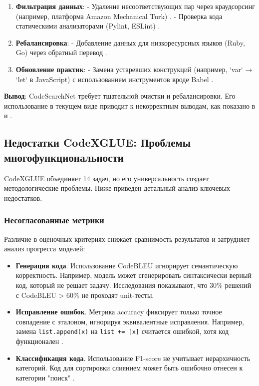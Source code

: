 \documentclass[14pt]{article}
\theoremstyle{definition}
\begin{document}
\begin{enumerate}
    \item \textbf{Фильтрация данных}: 
    - Удаление несоответствующих пар через краудсорсинг (например, платформа Amazon Mechanical Turk) \cite{zhang2020retrieval}.
    - Проверка кода статическими анализаторами (Pylint, ESLint) \cite{liu2022survey}.
    
    \item \textbf{Ребалансировка}: 
    - Добавление данных для низкоресурсных языков (Ruby, Go) через обратный перевод \cite{wan2023codet5+}.
    
    \item \textbf{Обновление практик}: 
    - Замена устаревших конструкций (например, `var` → `let` в JavaScript) с использованием инструментов вроде Babel \cite{zhu2022}.
\end{enumerate}

\textbf{Вывод}: CodeSearchNet требует тщательной очистки и ребалансировки. Его использование в текущем виде приводит к некорректным выводам, как показано в \cite{chen2023} и \cite{allamanis2019adverse}.



\newpage

\subsection{Недостатки CodeXGLUE: Проблемы многофункциональности}

CodeXGLUE \cite{lu2021codexglue} объединяет 14 задач, но его универсальность создает методологические проблемы. Ниже приведен детальный анализ ключевых недостатков.

\subsubsection{Несогласованные метрики}

Различие в оценочных критериях снижает сравнимость результатов и затрудняет анализ прогресса моделей:
\begin{itemize}
    \item \textbf{Генерация кода}. Использование CodeBLEU \cite{ren2021} игнорирует семантическую корректность. Например, модель может сгенерировать синтаксически верный код, который не решает задачу. Исследования \cite{chen2023} показывают, что 30\% решений с CodeBLEU > 60\% не проходят unit-тесты. 
    \item \textbf{Исправление ошибок}. Метрика accuracy фиксирует только точное совпадение с эталоном, игнорируя эквивалентные исправления. Например, замена \texttt{list.append(x)} на \texttt{list += [x]} считается ошибкой, хотя код функционален \cite{allamanis2019adverse}.
    \item \textbf{Классификация кода}. Использование F1-score не учитывает иерархичность категорий. Код для сортировки слиянием может быть ошибочно отнесен к категории "поиск" \cite{zhu2022}.
\end{itemize}
\end{document}
